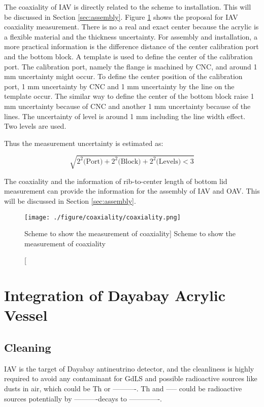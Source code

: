 The coaxiality of IAV is directly related to the scheme to installation.
This will be discussed in Section \ref{sec:assembly}.
Figure \ref{fig:coaxiality.png} shows the proposal for IAV coaxiality measurement.
There is no a real and exact center because the acrylic is a flexible material and
the thickness uncertainty. For assembly and installation, a more practical information is the difference
distance of the center calibration port and the bottom block.
A template is used to define the center of the calibration port.
The calibration port, namely the flange is machined by CNC, and around 1 mm uncertainty might occur.
To define the center position of the calibration port,
1 mm uncertainty by CNC and 1 mm uncertainty by the line on the template occur.
The similar way to define the center of the bottom block raise 1 mm uncertainty because of CNC and
another 1 mm uncertainty because of the lines.
The uncertainty of level is around 1 mm including the line width effect.
Two levels are used.

Thus the measurement uncertainty is estimated as:


\begin{equation}
\label{equ:coaxiality}
\sqrt{
2^2\mbox{(Port)} +
2^2\mbox{(Block)} +
2^2\mbox{(Levels)} < 3
}
\end{equation}


The coaxiality and the information of rib-to-center length of bottom lid measurement can
provide the information for the assembly of IAV and OAV. This will be discussed in Section \ref{sec:assembly}.


\begin{figure}
    \centering
    \texttt{[image: ./figure/coaxiality/coaxiality.png]}
    \caption
    [Scheme to show the measurement of coaxiality]
    {Scheme to show the measurement of coaxiality}
    \label{fig:coaxiality.png}
    \end{figure}




\section {Integration of Dayabay Acrylic Vessel}
\subsection {Cleaning}

IAV is the target of Dayabay antineutrino detector,
and the cleanliness is highly required to avoid any contaminant
for GdLS and possible radioactive sources like dusts in air, which
could be Th or ----------. Th and ----- could be radioactive sources potentially
by ----------decays to -------------.


